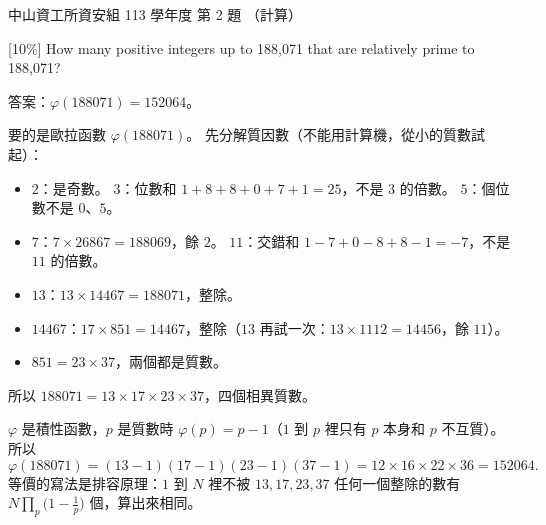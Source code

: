 \begin{pastexam}[label={px:nsysu-113-dmalg-02}]{中山資工所資安組 113 學年度 第 2 題}
（計算）

{[10\%]} How many positive integers up to 188,071 that are relatively prime to 188,071?
\end{pastexam}

\begin{pastsoln}
答案：$\varphi(188071) = 152064$。

要的是歐拉函數 $\varphi(188071)$。 先分解質因數（不能用計算機，從小的質數試起）：
\begin{itemize}
\item $2$：是奇數。 $3$：位數和 $1 + 8 + 8 + 0 + 7 + 1 = 25$，不是 $3$ 的倍數。 $5$：個位數不是 $0$、$5$。
\item $7$：$7 \times 26867 = 188069$，餘 $2$。 $11$：交錯和 $1 - 7 + 0 - 8 + 8 - 1 = -7$，不是 $11$ 的倍數。
\item $13$：$13 \times 14467 = 188071$，整除。
\item $14467$：$17 \times 851 = 14467$，整除（$13$ 再試一次：$13 \times 1112 = 14456$，餘 $11$）。
\item $851 = 23 \times 37$，兩個都是質數。
\end{itemize}
所以 $188071 = 13 \times 17 \times 23 \times 37$，四個相異質數。

$\varphi$ 是積性函數，$p$ 是質數時 $\varphi(p) = p - 1$（$1$ 到 $p$ 裡只有 $p$ 本身和 $p$ 不互質）。 所以
\[
\varphi(188071) = (13 - 1)(17 - 1)(23 - 1)(37 - 1) = 12 \times 16 \times 22 \times 36 = 152064 .
\]
等價的寫法是排容原理：$1$ 到 $N$ 裡不被 $13, 17, 23, 37$ 任何一個整除的數有
$N \prod_{p} \bigl(1 - \frac{1}{p}\bigr)$ 個，算出來相同。
\end{pastsoln}
